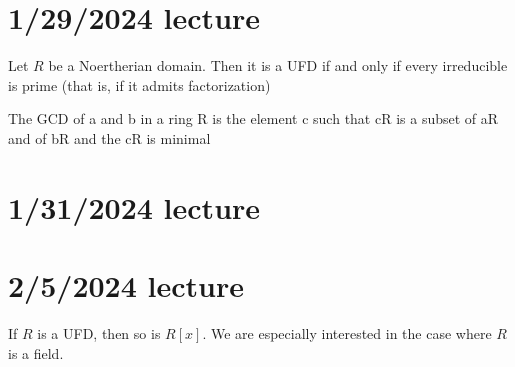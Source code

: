 \documentclass[12pt]{article}
\begin{document}
\section{1/29/2024 lecture}
Let $R$ be a Noertherian domain. Then it is a UFD if and only if every irreducible is prime (that is, if it admits factorization)
\par
The GCD of a and b in a ring R is the element c such that cR is a subset of aR and of bR and the cR is minimal
\section{1/31/2024 lecture}

\section{2/5/2024 lecture}
If $R$ is a UFD, then so is $R[x]$. We are especially interested in the case where $R$ is a field.
\end{document}

